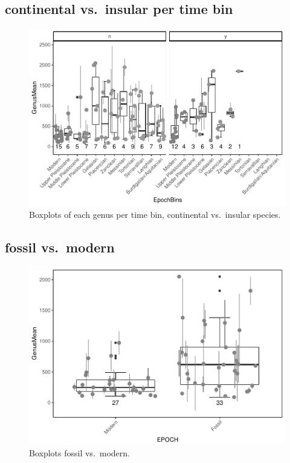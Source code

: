 \documentclass[]{article}
\begin{document}
\newpage

\subsection{continental vs.~insular per time
bin}\label{continental-vs.insular-per-time-bin}

\begin{figure}[htbp]
\centering
\includegraphics{MA_JJ_files/figure-latex/BPGBinsCI-1.pdf}
\caption{Boxplots of each genus per time bin, continental vs.~insular
species.}
\end{figure}

\newpage

\subsection{fossil vs.~modern}\label{fossil-vs.modern}

\begin{figure}[htbp]
\centering
\includegraphics{MA_JJ_files/figure-latex/BPMF-1.pdf}
\caption{Boxplots fossil vs.~modern.}
\end{figure}
\end{document}
